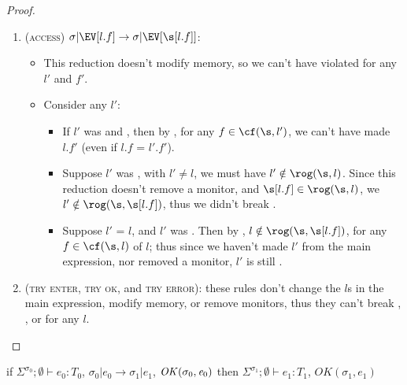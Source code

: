 \begin{proof}
\begin{enumerate}
\item (\textsc{access}) $\sigma|\EV[l.f]\rightarrow \sigma|\EV[\s[l.f]]$:
\begin{itemize}
	\item This reduction doesn't modify memory, so we can't have violated \CNC for any $l'$ and $f'$.
	\item Consider any $l'$:
	\begin{itemize}
		\item If $l'$ was \CNE and \CNA, then by , for any $f \in \cf(\s, l')$, we can't have made $l.f'$ \tmuty (even if $l.f$ = $l'.f'$).
		\item Suppose $l'$ was \CNO, with $l' \neq l$, we must have $l' \notin \rog(\s, l)$. Since this reduction doesn't remove a monitor, and $\s[l.f] \in \rog(\s, l)$, we $l' \notin \rog(\s, \s[l.f])$, thus we didn't break \CNO.
		\item Suppose $l'$ = $l$, and $l'$ was \CNO. Then by \CNC, $l \notin \rog(\s, \s[l.f])$, for any $f \in \cf(\s, l)$ of $l$; thus since we haven't made $l'$ \reach from the main expression, nor removed a monitor, $l'$ is still \CNO.
	\end{itemize}
\end{itemize}
\item (\textsc{try enter}, \textsc{try ok}, and \textsc{try error}):
these rules don't change the $l$s in the main expression, modify memory, or remove monitors, thus they can't break \CNC, \CNE, or \CNO for any $l$.
\end{enumerate}
\end{proof}
\vfill
{}
\begin{theorem}\rm
if $\Sigma^{\sigma_0};\emptyset\vdash e_0: T_0$,
$\sigma_0|e_0\rightarrow \sigma_1|e_1$,
$\mathit{OK}(\sigma_0,{\mathit{e}}_0)$
then
$\Sigma^{\sigma_1};\emptyset\vdash e_1: T_1$,
$\mathit{OK}(\sigma_1,e_1)$
\end{theorem}

